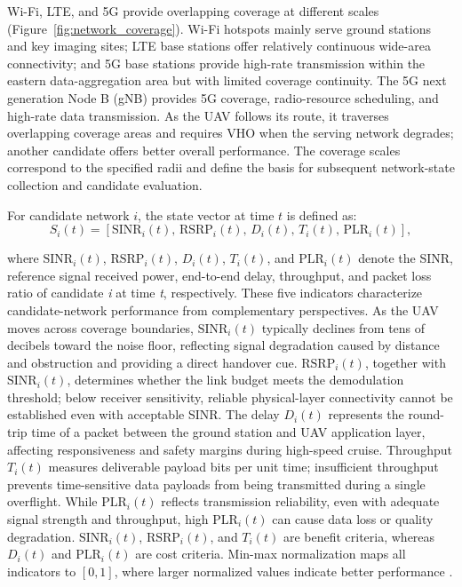 \documentclass[final,3p,times,twocolumn]{elsarticle}
\begin{document}
Wi-Fi, LTE, and 5G provide overlapping coverage at different scales (Figure~\ref{fig:network_coverage}). Wi-Fi hotspots mainly serve ground stations and key imaging sites; LTE base stations offer relatively continuous wide-area connectivity; and 5G base stations provide high-rate transmission within the eastern data-aggregation area but with limited coverage continuity. The 5G next generation Node B (gNB) provides 5G coverage, radio-resource scheduling, and high-rate data transmission. As the UAV follows its route, it traverses overlapping coverage areas and requires VHO when the serving network degrades; another candidate offers better overall performance. The coverage scales correspond to the specified radii and define the basis for subsequent network-state collection and candidate evaluation.

For candidate network $i$, the state vector at time $t$ is defined as:
\begin{equation}
S_i(t)=\left[\mathrm{SINR}_i(t),\,\mathrm{RSRP}_i(t),\,D_i(t),\,T_i(t),\,\mathrm{PLR}_i(t)\right],
\label{eq:state}
\end{equation}

where $\mathrm{SINR}_i(t)$, $\mathrm{RSRP}_i(t)$, $D_i(t)$, $T_i(t)$, and $\mathrm{PLR}_i(t)$ denote the SINR, reference signal received power, end-to-end delay, throughput, and packet loss ratio of candidate \textit{i} at time \textit{t}, respectively. These five indicators characterize candidate-network performance from complementary perspectives. As the UAV moves across coverage boundaries, $\mathrm{SINR}_i(t)$ typically declines from tens of decibels toward the noise floor, reflecting signal degradation caused by distance and obstruction and providing a direct handover cue. $\mathrm{RSRP}_i(t)$, together with $\mathrm{SINR}_i(t)$, determines whether the link budget meets the demodulation threshold; below receiver sensitivity, reliable physical-layer connectivity cannot be established even with acceptable SINR. The delay $D_i(t)$ represents the round-trip time of a packet between the ground station and UAV application layer, affecting responsiveness and safety margins during high-speed cruise. Throughput $T_i(t)$ measures deliverable payload bits per unit time; insufficient throughput prevents time-sensitive data payloads from being transmitted during a single overflight. While $\mathrm{PLR}_i(t)$ reflects transmission reliability, even with adequate signal strength and throughput, high $\mathrm{PLR}_i(t)$ can cause data loss or quality degradation. $\mathrm{SINR}_i(t)$, $\mathrm{RSRP}_i(t)$, and $T_i(t)$ are benefit criteria, whereas $D_i(t)$ and $\mathrm{PLR}_i(t)$ are cost criteria. Min-max normalization maps all indicators to $[0,1]$, where larger normalized values indicate better performance \cite{ref11}.
\end{document}
